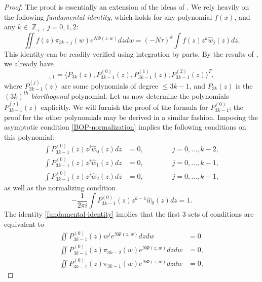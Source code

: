 \documentclass[usenames,dvipsnames]{article}
\theoremstyle{definition}
\DeclareMathOperator{\ZZ}{\mathbb{Z}}
\numberwithin{equation}{section}
\numberwithin{figure}{section}
\begin{document}
\begin{proof}
    The proof is essentially an extension of the ideas of \cite{KM}. We rely heavily on the following \textit{fundamental identity}, which holds for any polynomial $f(x)$, and any $k\in \ZZ_+$, $j=0,1,2$:
        \begin{equation}\label{fundamental-identity}
            \iint f(z)\pi_{3k+j}(w) e^{N\Phi(z,w)}dzdw = (-N\tau)^k\int f(z)z^k\hat{w}_j(z)dz.
        \end{equation}
    This identity can be readily verified using integration by parts. By the results of \cite{KM}, we already have
        \begin{equation*}
            [\boldsymbol{Y}(z)]_{\cdot,1} = \langle P_{3k}(z), P_{3k-1}^{(0)}(z), P_{3k-1}^{(1)}(z), P_{3k-1}^{(2)}(z)\rangle^T,
        \end{equation*}
    where $P_{3k-1}^{(j)}(z)$ are some polynomials of degree $\leq 3k-1$, and $P_{3k}(z)$ is the $(3k)^{th}$ \textit{biorthogonal} polynomial. Let us now determine the polynomials $P_{3k-1}^{(j)}(z)$ explicitly.
    We will furnish the proof of the formula for $P_{3k-1}^{(0)}$; the proof for the other polynomials may be derived in a similar fashion.  Imposing the asymptotic condition \eqref{BOP-normalization} implies the following conditions on this polynomial:
        \begin{align*}
            \int P_{3k-1}^{(0)}(z) z^j \hat{w}_0(z) dz &= 0,\qquad\qquad j=0,...,k-2,\\
            \int P_{3k-1}^{(0)}(z) z^j \hat{w}_1(z) dz &= 0,\qquad\qquad j=0,...,k-1,\\
            \int P_{3k-1}^{(0)}(z) z^j \hat{w}_2(z) dz &= 0,\qquad\qquad j=0,...,k-1,
        \end{align*}
    as well as the normalizing condition
        \begin{equation*}
            -\frac{1}{2\pi i}\int P_{3k-1}^{(0)}(z) z^{k-1}\hat{w}_0(z)dz = 1.
        \end{equation*}
    The identity \eqref{fundamental-identity} implies that the first $3$ sets of conditions are equivalent to
        \begin{align}
            \iint P_{3k-1}^{(0)}(z) w^j e^{N\Phi(z,w)}dzdw &= 0\label{star}\\
            \iint P_{3k-1}^{(0)}(z) \pi_{3k-2}(w) e^{N\Phi(z,w)}dzdw &= 0,\label{star-star}\\
            \iint P_{3k-1}^{(0)}(z) \pi_{3k-1}(w) e^{N\Phi(z,w)}dzdw &= 0,\label{star-star-star}
        \end{align}

\end{proof}
\end{document}
